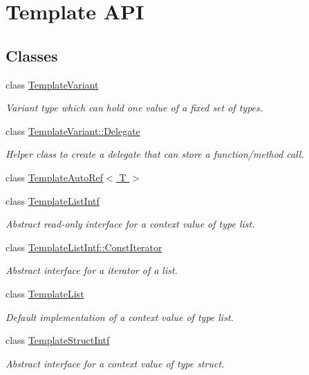 \hypertarget{group__template__api}{}\section{Template A\+P\+I}
\label{group__template__api}
\subsection*{Classes}
\begin{DoxyCompactItemize}
\item 
class \hyperlink{class_template_variant}{Template\+Variant}
\begin{DoxyCompactList}\small\item\em Variant type which can hold one value of a fixed set of types. \end{DoxyCompactList}\item 
class \hyperlink{class_template_variant_1_1_delegate}{Template\+Variant\+::\+Delegate}
\begin{DoxyCompactList}\small\item\em Helper class to create a delegate that can store a function/method call. \end{DoxyCompactList}\item 
class \hyperlink{class_template_auto_ref}{Template\+Auto\+Ref$<$ T $>$}
\item 
class \hyperlink{class_template_list_intf}{Template\+List\+Intf}
\begin{DoxyCompactList}\small\item\em Abstract read-\/only interface for a context value of type list. \end{DoxyCompactList}\item 
class \hyperlink{class_template_list_intf_1_1_const_iterator}{Template\+List\+Intf\+::\+Const\+Iterator}
\begin{DoxyCompactList}\small\item\em Abstract interface for a iterator of a list. \end{DoxyCompactList}\item 
class \hyperlink{class_template_list}{Template\+List}
\begin{DoxyCompactList}\small\item\em Default implementation of a context value of type list. \end{DoxyCompactList}\item 
class \hyperlink{class_template_struct_intf}{Template\+Struct\+Intf}
\begin{DoxyCompactList}\small\item\em Abstract interface for a context value of type struct. \end{DoxyCompactList}\item 

\end{DoxyCompactItemize}
